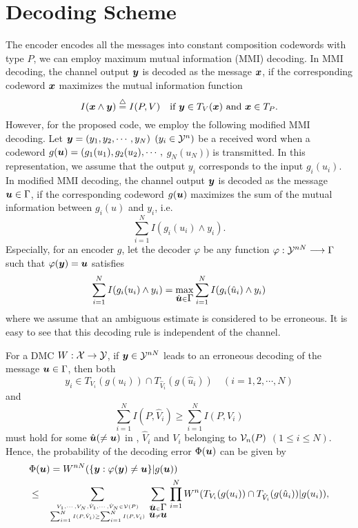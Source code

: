 \section{Decoding Scheme}
%
The encoder encodes all the messages into constant composition
codewords with type $P$, we can employ maximum mutual information (MMI)
decoding\cite{ck}. 
In MMI decoding, the channel output $\mbox{\boldmath{$y$}}$ is decoded as the message $\mbox{\boldmath{$x$}}$,
if the corresponding codeword $\mbox{\boldmath{$x$}}$ maximizes the mutual information function
\begin{equation}
 I(\mbox{\boldmath{$x$}}\wedge \mbox{\boldmath{$y$}}) \stackrel{\triangle}{=} I(P,V) \quad \mbox{if $\mbox{\boldmath{$y$}}\in T_V(\mbox{\boldmath{$x$}})$ and $\mbox{\boldmath{$x$}}\in T_P$}.
\end{equation}
However, for the proposed code,
we employ the following modified MMI decoding.
Let $\mbox{\boldmath{$y$}}=(y_1,y_2,\cdots,y_N)$ $(y_i\in {\cal Y}^n)$ be a received word
when a codeword $g(\mbox{\boldmath{$u$}})=(g_1(u_1),g_2(u_2),\cdots,$ $g_N(u_N))$
is transmitted. In this representation, we assume that the output
$y_i$ corresponds to the input $g_i(u_i)$.
In modified MMI decoding, 
the channel output $\mbox{\boldmath{$y$}}$ is decoded as the message $\mbox{\boldmath{$u$}}\in\mbox{$\Gamma$}$,
if the corresponding codeword $g(\mbox{\boldmath{$u$}})$
maximizes the sum of the mutual information between $g_i(u)$ and $y_i$, i.e.
\begin{equation}
 \sum_{i=1}^N I(g_i(u_i)\wedge y_i).
\end{equation}
Especially, for an encoder $g$, let the decoder $\varphi$
be any function $\varphi:{\cal Y}^{nN}\longrightarrow \Gamma$ such that
$\varphi(\mbox{\boldmath{$y$}})=\mbox{\boldmath{$u$}}$ satisfies
\begin{equation}
 \sum_{i=1}^N I(g_i(u_i)\wedge y_i)
  =\max_{\hat{\mbox{\boldmath{$u$}}}\in \mbox{$\Gamma$}}\sum_{i=1}^N I(g_i(\hat{u}_i)\wedge y_i)
\end{equation}
where we assume that an ambiguous estimate is considered to be erroneous.
It is easy to see that this decoding rule is independent of the channel.

For a DMC $W:{\cal X}\rightarrow{\cal Y}$, if $\mbox{\boldmath{$y$}}\in {\cal Y}^{nN}$ leads to an
erroneous decoding of the message $\mbox{\boldmath{$u$}}\in\mbox{$\Gamma$}$, then both
\begin{equation}
 y_i \in T_{V_i}(g(u_i))\cap T_{\hat{V}_i}(g(\hat{u}_i)) \quad (i=1,2,\cdots,N)
\end{equation}
and
\begin{equation}
 \sum_{i=1}^N I(P,\hat{V}_i)\ge \sum_{i=1}^N I(P,V_i)
\label{ced1}
\end{equation}
must hold for some $\hat{\mbox{\boldmath{$u$}}}(\neq \mbox{\boldmath{$u$}})$ in \g, $\hat{V}_i$ and 
$V_i$ belonging to ${\cal V}_n(P)$ $(1\le i\le N)$. Hence,
the probability of the decoding error $\Phi(\mbox{\boldmath{$u$}})$ can be given by
\begin{eqnarray}
\lefteqn{\Phi(\u)= W^{nN}(\{\y:\varphi(\y)\neq\u\}|g(\u))} \nonumber\\
 &\le &  
  \sum_{V_1,\cdots,V_N,\hat{V}_1,\cdots,\hat{V}_N\in {\cal V}(P)
       \atop \sum_{i=1}^N I(P,\hat{V}_i)\ge \sum_{i=1}^N I(P,V_i)}
  \sum_{\hat{\u}\in \g \atop \hat{\u}\neq \u}
  \prod_{i=1}^N 
  W^n (T_{V_i}(g(u_i))\cap T_{\hat{V}_i}(g(\hat{u}_i)) | g(u_i)),
\label{phisum}
\end{eqnarray}

